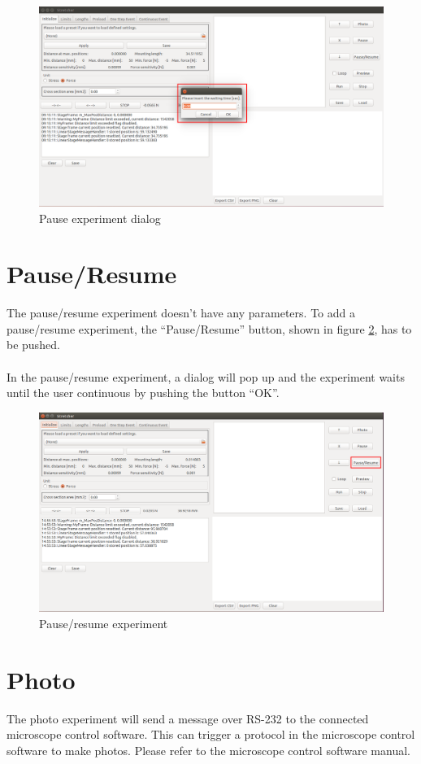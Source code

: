 \begin{figure}[!ht]
	\centering
		\includegraphics[width=1.0\textwidth]{images/Pause2}
	\caption{Pause experiment dialog}
	\label{fig:pause2}
\end{figure}

\section{Pause/Resume}
The pause/resume experiment doesn't have any parameters. To add a pause/resume experiment, the ``Pause/Resume'' button, shown in figure \ref{fig:pauseresume}, has to be pushed.
\\
\\
In the pause/resume experiment, a dialog will pop up and the experiment waits until the user continuous by pushing the button ``OK''.

\begin{figure}[!ht]
	\centering
		\includegraphics[width=1.0\textwidth]{images/PauseResume}
	\caption{Pause/resume experiment}
	\label{fig:pauseresume}
\end{figure}

\section{Photo}
The photo experiment will send a message over RS-232 to the connected microscope control software. This can trigger a protocol in the microscope control software to make photos. Please refer to the microscope control software manual.